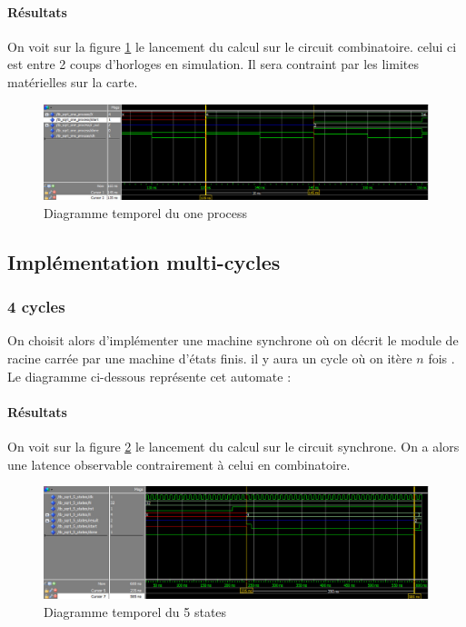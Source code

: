 \documentclass[12pt,a4paper]{article}
\begin{document}
\paragraph{Résultats}
On voit sur la figure \ref{fig:oneprocess} le lancement du calcul sur le circuit combinatoire. celui ci est entre 2 coups d'horloges en simulation. Il sera contraint par les limites matérielles sur la carte. 
\begin{figure}[H]
	\centering
	\includegraphics[width=\linewidth]{figures/one_process}
	\caption{Diagramme temporel du one process}
	\label{fig:oneprocess}
\end{figure}


\subsection{Implémentation multi-cycles}
\subsubsection{4 cycles}
On choisit alors d'implémenter une machine synchrone où on décrit le module de racine carrée par une machine d'états finis. il y aura un cycle où on itère $n$ fois . Le diagramme ci-dessous représente cet automate :
\begin{figure}[H]
\centering

\end{figure}

\paragraph{Résultats}
On voit sur la figure \ref{fig:5states} le lancement du calcul sur le circuit synchrone. On a alors une latence observable contrairement à celui en combinatoire.
\begin{figure}[H]
	\centering
	\includegraphics[width=\linewidth]{figures/5_stats}
	\caption{Diagramme temporel du 5 states}
	\label{fig:5states}
\end{figure}
\end{document}
